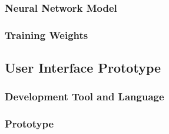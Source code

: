 \subsubsection{Neural Network Model}
\subsubsection{Training Weights}


\subsection{User Interface Prototype} 

\subsubsection{Development Tool and Language}
\subsubsection{Prototype}
\subsubsection{}

\subsection{}

\cleardoublepage